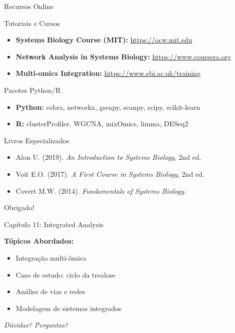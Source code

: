 \begin{frame}{Recursos Online}
\begin{block}{Tutoriais e Cursos}
\begin{itemize}
    \item \textbf{Systems Biology Course (MIT):} \url{https://ocw.mit.edu}
    \item \textbf{Network Analysis in Systems Biology:} \url{https://www.coursera.org}
    \item \textbf{Multi-omics Integration:} \url{https://www.ebi.ac.uk/training}
\end{itemize}
\end{block}

\begin{block}{Pacotes Python/R}
\begin{itemize}
    \item \textbf{Python:} cobra, networkx, gseapy, scanpy, scipy, scikit-learn
    \item \textbf{R:} clusterProfiler, WGCNA, mixOmics, limma, DESeq2
\end{itemize}
\end{block}

\begin{block}{Livros Especializados}
\begin{itemize}
    \item Alon U. (2019). \textit{An Introduction to Systems Biology}, 2nd ed.
    \item Voit E.O. (2017). \textit{A First Course in Systems Biology}, 2nd ed.
    \item Covert M.W. (2014). \textit{Fundamentals of Systems Biology}.
\end{itemize}
\end{block}
\end{frame}

\begin{frame}
\begin{center}
{\Huge Obrigado!}

\vspace{1cm}

{\Large Capítulo 11: Integrated Analysis}

\vspace{1cm}

\textbf{Tópicos Abordados:}
\begin{itemize}
    \item Integração multi-ômica
    \item Caso de estudo: ciclo da trealose
    \item Análise de vias e redes
    \item Modelagem de sistemas integrados
\end{itemize}

\vspace{1cm}

\textit{Dúvidas? Perguntas?}
\end{center}
\end{frame}


